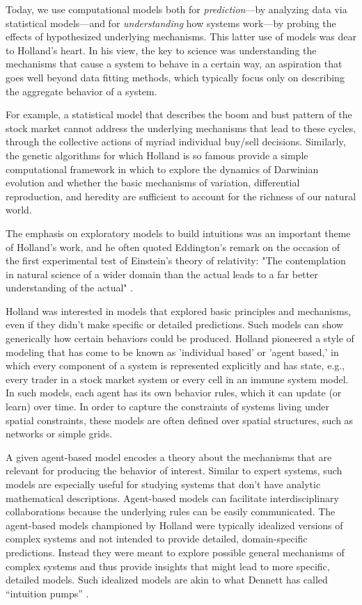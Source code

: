 \documentclass{sig-alternate}
\begin{document}
Today, we use computational models both for \emph{prediction}---by
analyzing data via statistical models---and for \emph{understanding}
how systems work---by probing the effects of hypothesized underlying
mechanisms.  This latter use of models was dear to Holland's heart.
In his view, the key to science was understanding the mechanisms that
cause a system to behave in a certain way, an aspiration that goes
well beyond data fitting methods, which typically focus only on
describing the aggregate behavior of a system.  

For example, a statistical model that describes the boom and bust
pattern of the stock market cannot address the underlying mechanisms
that lead to these cycles, through the collective actions of myriad
individual buy/sell decisions.  Similarly, the genetic algorithms for
which Holland is so famous provide a simple computational framework in
which to explore the dynamics of Darwinian evolution and whether the
basic mechanisms of variation, differential reproduction, and heredity
are sufficient to account for the richness of our natural world.  

The emphasis on exploratory models to build intuitions was an
important theme of Holland's work, and he often quoted Eddington's
remark on the occasion of the first experimental test of Einstein's
theory of relativity: "The contemplation in natural science of a wider
domain than the actual leads to a far better understanding of the
actual" \cite{Eddington1927}.

Holland was interested in models that explored basic principles and
mechanisms, even if they didn't make specific or detailed predictions.
Such models can show generically how certain behaviors could be produced.
Holland pioneered a style of modeling that has come to be known as
'individual based' or 'agent based,' in which every component of a
system is represented explicitly and has state, e.g., every trader in
a stock market system or every cell in an immune system model.  In
such models, each agent has its own behavior rules, which it can
update (or learn) over time.  In order to capture the constraints of
systems living under spatial constraints, these models are often
defined over spatial structures, such as networks or simple grids.  

A given agent-based model encodes a theory about the mechanisms that
are relevant for producing the behavior of interest.  Similar to
expert systems, such models are especially useful for studying systems
that don't have analytic mathematical descriptions.  Agent-based
models can facilitate interdisciplinary collaborations because the
underlying rules can be easily communicated.  The agent-based models
championed by Holland were typically idealized versions of complex
systems and not intended to provide detailed, domain-specific
predictions.  Instead they were meant to explore possible general
mechanisms of complex systems and thus provide insights that might
lead to more specific, detailed models.  Such idealized models are
akin to what Dennett has called ``intuition pumps''
\cite{Dennett1984}.
\end{document}
